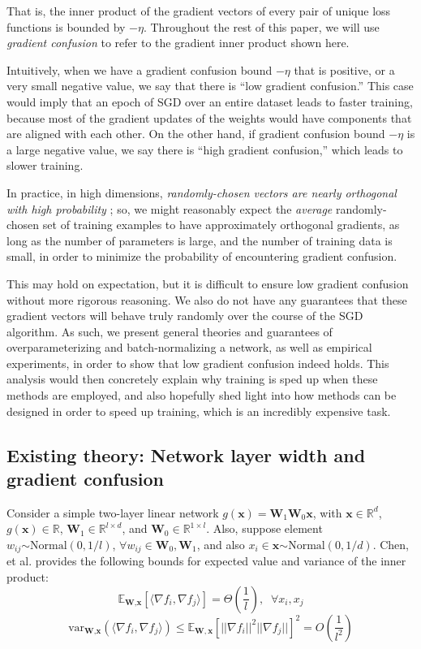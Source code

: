 \documentclass{article}
\begin{document}
That is, the inner product of the gradient vectors of every pair of unique loss functions is bounded by $-\eta$. Throughout the rest of this paper, we will use \textit{gradient confusion} to refer to the gradient inner product shown here.

Intuitively, when we have a gradient confusion bound $-\eta$ that is positive, or a very small negative value, we say that there is ``low gradient confusion.'' This case would imply that an epoch of SGD over an entire dataset leads to faster training, because most of the gradient updates of the weights would have components that are aligned with each other. On the other hand, if gradient confusion bound $-\eta$ is a large negative value, we say there is ``high gradient confusion,'' which leads to slower training.

In practice, in high dimensions, \textit{randomly-chosen vectors are nearly orthogonal with high probability} \cite{Milman}; so, we might reasonably expect the \textit{average} randomly-chosen set of training examples to have approximately orthogonal gradients, as long as the number of parameters is large, and the number of training data is small, in order to minimize the probability of encountering gradient confusion. 

This may hold on expectation, but it is difficult to ensure low gradient confusion without more rigorous reasoning. We also do not have any guarantees that these gradient vectors will behave truly randomly over the course of the SGD algorithm. As such, we present general theories and guarantees of overparameterizing and batch-normalizing a network, as well as empirical experiments, in order to show that low gradient confusion indeed holds. This analysis would then concretely explain why training is sped up when these methods are employed, and also hopefully shed light into how methods can be designed in order to speed up training, which is an incredibly expensive task.

\subsection{Existing theory: Network layer width and gradient confusion}
Consider a simple two-layer linear network $g(\textbf{x}) = \textbf{W}_1 \textbf{W}_0 \textbf{x}$, with $\textbf{x} \in \mathbb{R}^d$, $g(\textbf{x}) \in \mathbb{R}$, $\textbf{W}_1 \in \mathbb{R}^{l \times d}$, and $\textbf{W}_0 \in \mathbb{R}^{1 \times l}$. Also, suppose element $w_{ij} \stackrel{}{\sim} \text{Normal}(0, 1/l)$, $\forall w_{ij} \in \textbf{W}_0, \textbf{W}_1$, and also $x_i \in \textbf{x} \stackrel{}{\sim} \text{Normal}(0, 1/d)$. Chen, et al. \cite{chen} provides the following bounds for expected value and variance of the inner product:
$$\mathbb{E}_{\textbf{W}, \textbf{x}}[\langle \nabla f_i, \nabla f_j \rangle] = \Theta(\frac{1}{l}), \;\; \forall x_i, x_j$$
$$\text{var}_{\textbf{W}, \textbf{x}}(\langle \nabla f_i, \nabla f_j \rangle) \leq \mathbb{E}_{\mathbf{W}, \mathbf{x}} [||\nabla f_i||^2 ||\nabla f_j||]^2 = O(\frac{1}{l^2})$$
\end{document}
